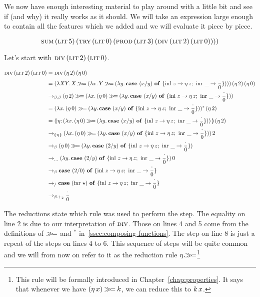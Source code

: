 We now have enough interesting material to play around with a little bit
and see if (and why) it really works as it should. We will take an
expression large enough to contain all the features which we added and we
will evaluate it piece by piece.

$$
\textsc{sum}\,(\textsc{lit}\,5)\,(\textsc{try}\,(\textsc{lit}\,0)\,(\textsc{prod}\,(\textsc{lit}\,3)\,(\textsc{div}\,(\textsc{lit}\,2)\,(\textsc{lit}\,0))))
$$

Let's start with $\textsc{div}\,(\textsc{lit}\,2)\,(\textsc{lit}\,0)$.

\begin{align*}
  \app{\dive}{\litec{2}}{\litec{0}}
  &= \app{\dive}{(\ap{\eta}{2})}
                {(\ap{\eta}{0})} \\
  &= \app{(\lam{X Y}{X \hsbind (\lam{x}{Y \hsbind (\lam{y}
          {\case{(x / y)}{z}{\ap{\eta}{z}}{\_}{\dbze}})})})}
                {(\ap{\eta}{2})} {(\ap{\eta}{0})} \\
  &\to_{\beta,\beta} (\ap{\eta}{2}) \hsbind (\lam{x}{(\ap{\eta}{0}) \hsbind (\lam{y}
          {\case{(x / y)}{z}{\ap{\eta}{z}}{\_}{\dbze}})}) \\
  &= \ap{(\lam{x}{(\ap{\eta}{0}) \hsbind (\lam{y}
          {\case{(x / y)}{z}{\ap{\eta}{z}}{\_}{\dbze}})})^*}{(\ap{\eta}{2})} \\
  &= \ap{\banana{\onto{\eta}{(\lam{x}{(\ap{\eta}{0}) \hsbind (\lam{y}
          {\case{(x / y)}{z}{\ap{\eta}{z}}{\_}{\dbze}})})}}}{(\ap{\eta}{2})} \\
  &\to_{\banana{\eta}} \ap{(\lam{x}{(\ap{\eta}{0}) \hsbind (\lam{y}
          {\case{(x / y)}{z}{\ap{\eta}{z}}{\_}{\dbze}})})}{2} \\
  &\to_{\beta} (\ap{\eta}{0}) \hsbind (\lam{y}
          {\case{(2 / y)}{z}{\ap{\eta}{z}}{\_}{\dbze}}) \\
  &\to_{\ldots} \ap{(\lam{y}{\case{(2 / y)}{z}{\ap{\eta}{z}}{\_}{\dbze}})}{0} \\
  &\to_{\beta} \case{(2 / 0)}{z}{\ap{\eta}{z}}{\_}{\dbze} \\
  &\to_{/} \case{(\ap{\inr}{\star})}{z}{\ap{\eta}{z}}{\_}{\dbze} \\
  &\to_{\beta.+_2} \dbze \\
\end{align*}

The reductions state which rule was used to perform the step. The equality
on line 2 is due to our interpretation of $\textsc{div}$. Those on lines 4 and 5
come from the definitions of $\mathbin{\gg\!=}$ and $^*$
in~\ref{ssec:composing-functions}. The step on line 8 is just a repeat of
the steps on lines 4 to 6. This sequence of steps will be quite common and
we will from now on refer to it as the reduction rule
$\eta.\mathbin{\gg\!=}$\footnote{This rule will be formally introduced in
  Chapter~\ref{chap:properties}. It says that whenever we have
  $(\eta\,x) \mathbin{\gg\!=} k$, we can reduce this to $k\,x$.}

